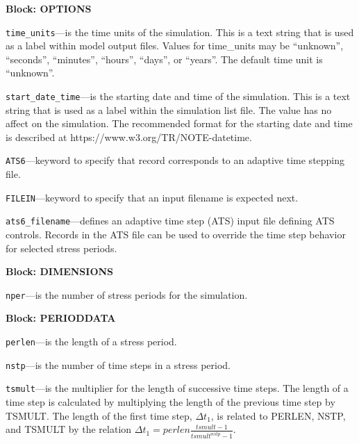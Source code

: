 
\item \textbf{Block: OPTIONS}

\begin{description}
\item \texttt{time\_units}---is the time units of the simulation.  This is a text string that is used as a label within model output files.  Values for time\_units may be ``unknown'',  ``seconds'', ``minutes'', ``hours'', ``days'', or ``years''.  The default time unit is ``unknown''.

\item \texttt{start\_date\_time}---is the starting date and time of the simulation.  This is a text string that is used as a label within the simulation list file.  The value has no affect on the simulation.  The recommended format for the starting date and time is described at https://www.w3.org/TR/NOTE-datetime.

\item \texttt{ATS6}---keyword to specify that record corresponds to an adaptive time stepping file.

\item \texttt{FILEIN}---keyword to specify that an input filename is expected next.

\item \texttt{ats6\_filename}---defines an adaptive time step (ATS) input file defining ATS controls.  Records in the ATS file can be used to override the time step behavior for selected stress periods.

\end{description}
\item \textbf{Block: DIMENSIONS}

\begin{description}
\item \texttt{nper}---is the number of stress periods for the simulation.

\end{description}
\item \textbf{Block: PERIODDATA}

\begin{description}
\item \texttt{perlen}---is the length of a stress period.

\item \texttt{nstp}---is the number of time steps in a stress period.

\item \texttt{tsmult}---is the multiplier for the length of successive time steps. The length of a time step is calculated by multiplying the length of the previous time step by TSMULT. The length of the first time step, $\Delta t_1$, is related to PERLEN, NSTP, and TSMULT by the relation $\Delta t_1= perlen \frac{tsmult - 1}{tsmult^{nstp}-1}$.

\end{description}

